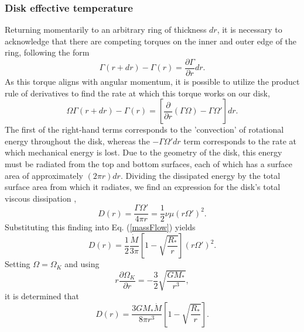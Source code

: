 \documentclass[aps,pra, twocolumn]{revtex4-1}
\begin{document}
\subsubsection{\label{section 2.2.2} Disk effective temperature}
Returning momentarily to an arbitrary ring of thickness $dr$, it is necessary to acknowledge that there are competing torques on the inner and outer edge of the ring, following the form
\begin{equation}
\Gamma(r + dr) - \Gamma(r) = \frac{\partial \Gamma}{\partial r}dr \nonumber.
\end{equation}
As this torque aligns with angular momentum, it is possible to utilize the product rule of derivatives to find the rate at which this torque works on our disk,
\begin{equation}
\Omega\Gamma(r + dr) - \Gamma(r) = \left[ \frac{\partial}{\partial r}(\Gamma\Omega) - \Gamma\Omega' \right]dr. \nonumber
\end{equation}
The first of the right-hand terms corresponds to the 'convection' of rotational energy throughout the disk, whereas the $-\Gamma\Omega' dr$ term corresponds to the rate at which mechanical energy is lost.  Due to the geometry of the disk, this energy must be radiated from the top and bottom surfaces, each of which has a surface area of approximately $(2\pi r)dr$. Dividing the dissipated energy by the total surface area from which it radiates, we find an expression for the disk's total viscous dissipation \cite{king2002},
\begin{equation}
D(r) = \frac{\Gamma \Omega'}{4\pi r}= \frac{1}{2}\nu \mu (r\Omega')^2.
\end{equation}
Substituting this finding into Eq. (\ref{massFlow}) yields
\begin{equation}
D(r) =\frac{1}{2}\frac{\dot{M}}{3\pi}\left[ 1 - \sqrt{\frac{R_*}{r}} \right] (r\Omega')^2. \nonumber
\end{equation}
Setting $\Omega = \Omega_K$ and using
\begin{equation}
r\frac{\partial\Omega_K}{\partial r} = -\frac{3}{2}\sqrt{\frac{G M_*}{r^3}}, \nonumber
\end{equation}
it is determined that
\begin{equation}
D(r) = \frac{3GM_*\dot{M}}{8\pi r^3}\left[ 1 - \sqrt{\frac{R_*}{r}} \right].
\end{equation}
\end{document}
